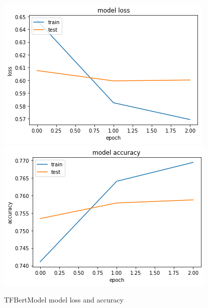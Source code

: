 \documentclass[12pt]{article}
\begin{document}
\begin{figure}[h!]
    \centering
    \includegraphics{trans_loss.png}
    \includegraphics{trans_acc.png}
    \caption{TFBertModel model loss and accuracy}
    \label{fig:tr}
\end{figure}
\medskip
\end{document}
